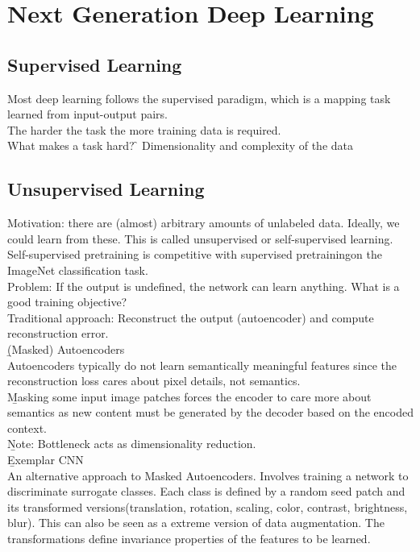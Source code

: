 \section{Next Generation Deep Learning}

\subsection{Supervised Learning}
Most deep learning follows the supervised paradigm, which is a mapping task learned from input-output pairs.\\

The harder the task the more training data is required.\\

What makes a task hard? \f{\to} Dimensionality and complexity of the data

\subsection{Unsupervised Learning}
Motivation: there are (almost) arbitrary amounts of unlabeled data. Ideally, we could learn from these. This is called unsupervised or self-supervised learning.\\

Self-supervised pretraining is competitive with supervised pretrainingon the ImageNet classification task.\\

Problem: If the output is undefined, the network can learn anything. What is a good training objective?\\

Traditional approach: Reconstruct the output (autoencoder) and compute reconstruction error.\\

\b{(Masked) Autoencoders\\[0.5em]}
Autoencoders typically do not learn semantically meaningful features since the reconstruction loss cares about pixel details, not semantics.\\

\b{Masking} some input image patches forces the encoder to care more about semantics as new content must be generated by the decoder based on the encoded context.\\

\b{Note:} Bottleneck acts as dimensionality reduction.\\

\b{Exemplar CNN\\[0.5em]}
An alternative approach to Masked Autoencoders. Involves training a network to discriminate surrogate classes. Each class is defined by a random seed patch and its transformed versions(translation, rotation, scaling, color, contrast, brightness, blur). This can also be seen as a extreme version of data augmentation. The transformations define invariance properties of the features to be learned.\\

